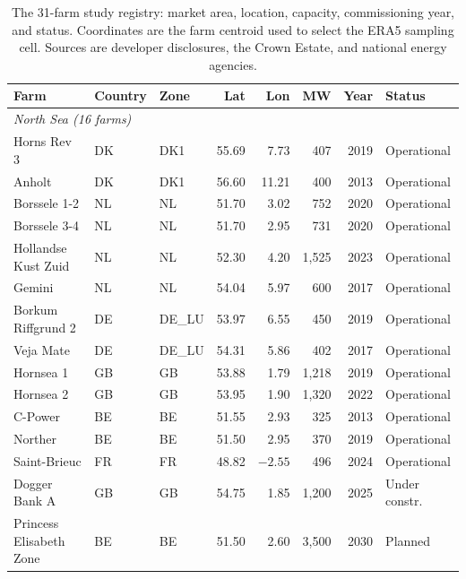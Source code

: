 \begin{table}[!htb]
\centering
\footnotesize
\caption{The 31-farm study registry: market area, location, capacity, commissioning
year, and status. Coordinates are the farm centroid used to select the ERA5 sampling
cell. Sources are developer disclosures, the Crown Estate, and national energy
agencies.}
\label{tab:registry}
\begin{threeparttable}
\begin{tabular}{l l l r r r r l}
\toprule
\textbf{Farm} & \textbf{Country} & \textbf{Zone} & \textbf{Lat} & \textbf{Lon} &
\textbf{MW} & \textbf{Year} & \textbf{Status} \\
\midrule
\multicolumn{8}{l}{\textit{North Sea (16 farms)}} \\
Horns Rev 3              & DK & DK1   & 55.69 & 7.73   & 407   & 2019 & Operational \\
Anholt                   & DK & DK1   & 56.60 & 11.21  & 400   & 2013 & Operational \\
Borssele 1-2             & NL & NL    & 51.70 & 3.02   & 752   & 2020 & Operational \\
Borssele 3-4             & NL & NL    & 51.70 & 2.95   & 731   & 2020 & Operational \\
Hollandse Kust Zuid      & NL & NL    & 52.30 & 4.20   & 1,525 & 2023 & Operational \\
Gemini                   & NL & NL    & 54.04 & 5.97   & 600   & 2017 & Operational \\
Borkum Riffgrund 2       & DE & DE\_LU & 53.97 & 6.55  & 450   & 2019 & Operational \\
Veja Mate                & DE & DE\_LU & 54.31 & 5.86  & 402   & 2017 & Operational \\
Hornsea 1                & GB & GB    & 53.88 & 1.79   & 1,218 & 2019 & Operational \\
Hornsea 2                & GB & GB    & 53.95 & 1.90   & 1,320 & 2022 & Operational \\
C-Power                  & BE & BE    & 51.55 & 2.93   & 325   & 2013 & Operational \\
Norther                  & BE & BE    & 51.50 & 2.95   & 370   & 2019 & Operational \\
Saint-Brieuc             & FR & FR    & 48.82 & $-2.55$ & 496  & 2024 & Operational \\
Dogger Bank A            & GB & GB    & 54.75 & 1.85   & 1,200 & 2025 & Under constr. \\
Princess Elisabeth Zone  & BE & BE    & 51.50 & 2.60   & 3,500 & 2030 & Planned \\

\end{tabular}
\end{threeparttable}
\end{table}
